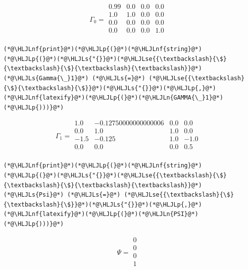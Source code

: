 \documentclass[12pt,a4paper]{article}
\newcommand{\HLJLn}[1]{#1}
\newcommand{\HLJLnf}[1]{\textcolor[RGB]{66,102,213}{#1}}
\newcommand{\HLJLs}[1]{\textcolor[RGB]{201,61,57}{#1}}
\newcommand{\HLJLse}[1]{\textcolor[RGB]{59,151,46}{#1}}
\newcommand{\HLJLp}[1]{#1}
\begin{document}
\begin{equation}
\Gamma_0 =
\begin{array}{cccc}
0.99 & 0.0 & 0.0 & 0.0 \\
1.0 & 1.0 & 0.0 & 0.0 \\
0.0 & 0.0 & 0.0 & 0.0 \\
0.0 & 0.0 & 0.0 & 1.0 \\
\end{array}
\end{equation}


\begin{lstlisting}
(*@\HLJLnf{print}@*)(*@\HLJLp{(}@*)(*@\HLJLnf{string}@*)(*@\HLJLp{(}@*)(*@\HLJLs{"{}}@*)(*@\HLJLse{{\textbackslash}{\$}{\textbackslash}{\$}{\textbackslash}{\textbackslash}}@*)(*@\HLJLs{Gamma{\_}1}@*) (*@\HLJLs{=}@*) (*@\HLJLse{{\textbackslash}{\$}{\textbackslash}{\$}}@*)(*@\HLJLs{"{}}@*)(*@\HLJLp{,}@*)(*@\HLJLnf{latexify}@*)(*@\HLJLp{(}@*)(*@\HLJLn{GAMMA{\_}1}@*)(*@\HLJLp{)))}@*)
\end{lstlisting}

\begin{equation}
\Gamma_1 =
\begin{array}{cccc}
1.0 & -0.12750000000000006 & 0.0 & 0.0 \\
0.0 & 1.0 & 1.0 & 0.0 \\
-1.5 & -0.125 & 1.0 & -1.0 \\
0.0 & 0.0 & 0.0 & 0.5 \\
\end{array}
\end{equation}


\begin{lstlisting}
(*@\HLJLnf{print}@*)(*@\HLJLp{(}@*)(*@\HLJLnf{string}@*)(*@\HLJLp{(}@*)(*@\HLJLs{"{}}@*)(*@\HLJLse{{\textbackslash}{\$}{\textbackslash}{\$}{\textbackslash}{\textbackslash}}@*)(*@\HLJLs{Psi}@*) (*@\HLJLs{=}@*) (*@\HLJLse{{\textbackslash}{\$}{\textbackslash}{\$}}@*)(*@\HLJLs{"{}}@*)(*@\HLJLp{,}@*)(*@\HLJLnf{latexify}@*)(*@\HLJLp{(}@*)(*@\HLJLn{PSI}@*)(*@\HLJLp{)))}@*)
\end{lstlisting}

\begin{equation}
\Psi = 
\begin{array}{c}
0 \\
0 \\
0 \\
1 \\
\end{array}
\end{equation}
\end{document}
